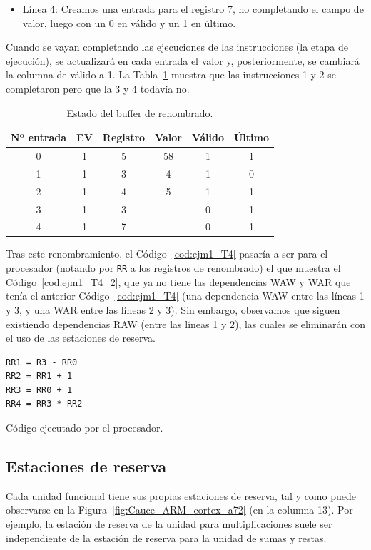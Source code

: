 \begin{ejemplo}
\begin{itemize}
        \item Línea 4: Creamos una entrada para el registro 7, no completando el campo de valor, luego con un 0 en válido y un 1 en último.
    \end{itemize}
    Cuando se vayan completando las ejecuciones de las instrucciones (la etapa de ejecución), se actualizará en cada entrada el valor y, posteriormente, se cambiará la columna de válido a 1. La Tabla~\ref{tab:ejm1_T4_2} muestra que las instrucciones 1 y 2 se completaron pero que la 3 y 4 todavía no.
    \begin{table}[H]
    \centering
    \begin{tabular}{|c|c|c|c|c|c|}
        \hline
        Nº entrada & EV & Registro & Valor & Válido & Último \\
        \hline
        0 & 1 & 5 & 58 & 1 & 1 \\
        \hline
        1 & 1 & 3 & 4 & 1 & 0 \\
        \hline
        2 & 1 & 4 & 5 & 1 & 1 \\
        \hline
        3 & 1 & 3 &   & 0 & 1 \\
        \hline
        4 & 1 & 7 &   & 0 & 1 \\
        \hline
    \end{tabular}
    \caption{Estado del buffer de renombrado.}
    \label{tab:ejm1_T4_2}
    \end{table}
    Tras este renombramiento, el Código~\ref{cod:ejm1_T4} pasaría a ser para el procesador (notando por \verb|RR| a los registros de renombrado) el que muestra el Código~\ref{cod:ejm1_T4_2}, que ya no tiene las dependencias WAW y WAR que tenía el anterior Código~\ref{cod:ejm1_T4} (una dependencia WAW entre las líneas 1 y 3, y una WAR entre las líneas 2 y 3). Sin embargo, observamos que siguen existiendo dependencias RAW (entre las líneas 1 y 2), las cuales se eliminarán con el uso de las estaciones de reserva.
    \begin{listing}[H]
    \begin{verbatim}
RR1 = R3 - RR0        
RR2 = RR1 + 1
RR3 = RR0 + 1
RR4 = RR3 * RR2
    \end{verbatim}
    \caption{Código ejecutado por el procesador.}
    \label{cod:ejm1_T4_2}
    \end{listing}
\end{ejemplo}

\subsection{Estaciones de reserva}
Cada unidad funcional tiene sus propias estaciones de reserva, tal y como puede observarse en la Figura~\ref{fig:Cauce_ARM_cortex_a72} (en la columna 13). Por ejemplo, la estación de reserva de la unidad para multiplicaciones suele ser independiente de la estación de reserva para la unidad de sumas y restas. 

